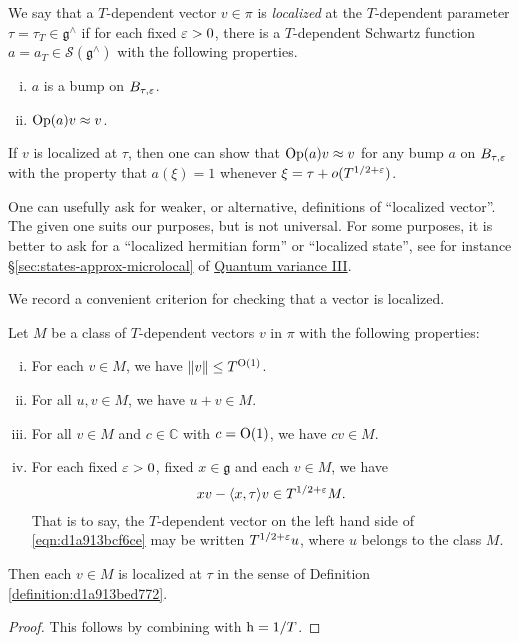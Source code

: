 \documentclass[reqno]{amsart} 
\numberwithin{equation}{section}
\numberwithin{theorem}{section}
\begin{document}
\begin{definition}\label{definition:d1a913bed772}
  We say that a $T$-dependent vector $v \in \pi$ is \emph{localized} at the $T$-dependent parameter $\tau = \tau_T \in \mathfrak{g}^\wedge$ if for each fixed $\varepsilon > 0$, there is a $T$-dependent Schwartz function $a = a_T \in \mathcal{S} (\mathfrak{g}^\wedge)$ with the following properties.
  \begin{enumerate}[(i)]
  \item $a$ is a bump on $B_{\tau,\varepsilon}$.
  \item $\operatorname{Op}(a) v \approx v$.
  \end{enumerate}
\end{definition}
\begin{remark}
  If $v$ is localized at $\tau$, then one can show that $\operatorname{Op}(a) v \approx v$ for any bump $a$ on $B_{\tau,\varepsilon}$ with the property that $a(\xi) = 1$ whenever $\xi = \tau + o(T^{1/2+\varepsilon})$.
\end{remark}
\begin{remark}
One can usefully ask for weaker, or alternative, definitions of ``localized vector''.  The given one suits our purposes, but is not universal.  For some purposes, it is better to ask for a ``localized hermitian form'' or ``localized state'', see for instance \S\ref{sec:states-approx-microlocal} of \href{var-quat-3-submitted.pdf}{Quantum variance III}.
\end{remark}

We record a convenient criterion for checking that a vector is localized.
\begin{theorem}\label{theorem:d1a913c8091b}
  Let $M$ be a class of $T$-dependent vectors $v$ in $\pi$ with the following properties:
  \begin{enumerate}[(i)]
  \item For each $v \in M$, we have $\lVert v \rVert \leq T^{\operatorname{O}(1)}$.
  \item For all $u, v \in M$, we have $u + v \in M$.
  \item For all $v \in M$ and $c \in \mathbb{C}$ with $c = \operatorname{O}(1)$, we have $c v \in M$.
  \item For each fixed $\varepsilon > 0$, fixed $x \in \mathfrak{g}$ and each $v \in M$, we have
    \begin{equation}\label{eqn:d1a913bcf6ce}
      x v - \langle x, \tau  \rangle v \in T^{1/2+\varepsilon} M.
    \end{equation}
    That is to say, the $T$-dependent vector on the left hand side of \eqref{eqn:d1a913bcf6ce} may be written $T^{1/2+\varepsilon} u$, where $u$ belongs to the class $M$.
  \end{enumerate}
  Then each $v \in M$ is localized at $\tau$ in the sense of Definition \ref{definition:d1a913bed772}.
\end{theorem}
\begin{proof}
  This follows by combining \cite[Lem 14.5, Thm 14.12]{2021arXiv210915230N} with $\operatorname{h} = 1/T$.
\end{proof}
\end{document}
